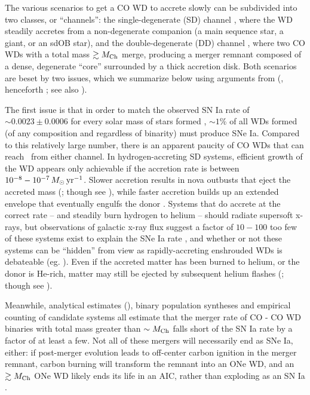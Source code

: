 The various scenarios to get a CO WD to accrete slowly can be subdivided into two classes, or ``channels'': the single-degenerate (SD) channel \citep{wheli73}, where the WD steadily accretes from a non-degenerate companion (a main sequence star, a giant, or an sdOB star), and the double-degenerate (DD) channel \citep{ibent84, webb84}, where two CO WDs with a total mass $\gtrsim\Mch$ merge, producing a merger remnant composed of a dense, degenerate ``core'' surrounded by a thick accretion disk.  Both scenarios are beset by two issues, which we summarize below using arguments from \citeauthor{vkercj10} (\citeyear{vkercj10}, henceforth \citeal{vkercj10}; see also \citealt{vker13}).

The first issue is that in order to match the observed SN Ia rate of $\sim 0.0023 \pm 0.0006$ for every solar mass of stars formed \citep{maoz+11}, $\sim1$\% of all WDs formed (of any composition and regardless of binarity) must produce SNe Ia.  Compared to this relatively large number, there is an apparent paucity of CO WDs that can reach \Mch\ from either channel.  In hydrogen-accreting SD systems, efficient growth of the WD appears only achievable if the accretion rate is between $10^{-8} - 10^{-7}\,\Msun\,\pyr$.  Slower accretion results in nova outbusts that eject the accreted mass (\citealt{townsb04}; though see \citealt{zorosg11}), while faster accretion builds up an extended envelope that eventually engulfs the donor \citep{ibent84}.  Systems that do accrete at the correct rate -- and steadily burn hydrogen to helium -- should radiate supersoft x-rays, but observations of galactic x-ray flux suggest a factor of $10 - 100$ too few of these systems exist to explain the SNe Ia rate \citep{dist10, gilfb10}, and whether or not these systems can be ``hidden'' from view as rapidly-accreting enshrouded WDs is debateable (eg. \citealt{hachkn10, lepok13, joha+14}).  Even if the accreted matter has been burned to helium, or the donor is He-rich, matter may still be ejected by subsequent helium flashes (\citealt{idanss13, pier+14}; though see \citealt{hill+16}).


Meanwhile, analytical estimates (\citealt{vkercj10}), binary population syntheses \citep{menn+10, ruitbf09, toonnp12, clae+14} and empirical counting of candidate systems \citep{badem12} all estimate that the merger rate of CO - CO WD binaries with total mass greater than $\sim\Mch$ falls short of the SN Ia rate by a factor of at least a few.  Not all of these mergers will necessarily end as SNe Ia, either: if post-merger evolution leads to off-center carbon ignition in the merger remnant, carbon burning will transform the remnant into an ONe WD, and an $\gtrsim\Mch$ ONe WD likely ends its life in an AIC, rather than exploding as an SN Ia \citep{nomoi85, saion85, yoonpr07, schw+16}.
 
